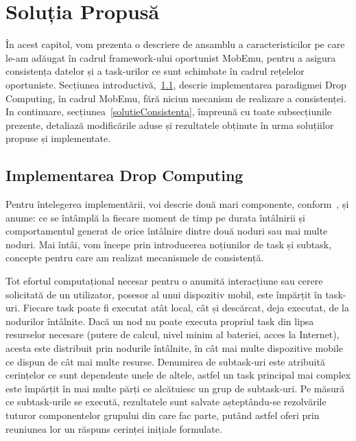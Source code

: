 \documentclass[12pt,a4paper]{report}
\begin{document}
\chapter{Soluția Propusă} \label{solutiaPropusa}

În acest capitol, vom prezenta o descriere de ansamblu a caracteristicilor pe care le-am adăugat în cadrul framework-ului oportunist MobEmu, pentru a asigura consistența datelor și a task-urilor ce sunt schimbate în cadrul rețelelor oportuniste. 
Secțiunea introductivă,~\ref{dropcomputing}, descrie implementarea paradigmei Drop Computing, în cadrul MobEmu, fără niciun mecanism de realizare a consistenței. In continuare, secțiunea~\ref{solutieConsistenta}, împreună cu toate subsecțiunile prezente, detaliază modificările aduse și rezultatele obținute în urma soluțiilor propuse și implementate.

\section{Implementarea Drop Computing} \label{dropcomputing}
Pentru întelegerea implementării, voi descrie două mari componente, conform~\cite{MobEmuArticle},  și anume: ce se întâmplă la fiecare moment de timp pe durata întâlnirii și comportamentul generat de orice întâlnire dintre două noduri sau mai multe noduri. Mai întâi, vom începe prin introducerea noțiunilor de task și subtask, concepte pentru care am realizat mecanismele de consistență.

Tot efortul computațional necesar pentru o anumită interacțiune sau cerere solicitată de un utilizator, posesor al unui dispozitiv mobil, este împărțit în task-uri. Fiecare task poate fi executat atât local, cât și descărcat, deja executat, de la nodurilor întâlnite. Dacă un nod nu poate executa propriul task din lipsa resurselor necesare (putere de calcul, nivel minim al bateriei, acces la Internet), acesta este distribuit prin nodurile întâlnite, în cât mai multe dispozitive mobile ce dispun de cât mai multe resurse. Denumirea de subtask-uri este atribuită cerințelor ce sunt dependente unele de altele, astfel un task principal mai complex este împărțit în mai multe părți ce alcătuiesc un grup de subtask-uri. Pe măsură ce subtask-urile se execută, rezultatele sunt salvate așteptându-se rezolvările tuturor componentelor grupului din care fac parte, putând astfel oferi prin reuniunea lor un răspuns cerinței inițiale formulate. 
\end{document}
